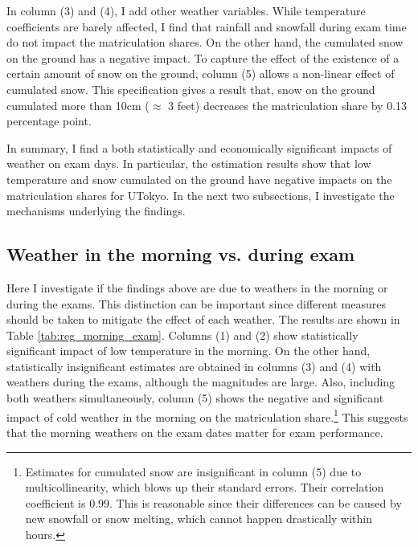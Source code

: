 \documentclass[12pt,letterpaper]{article}
\begin{document}
In column (3) and (4), I add other weather variables.
While temperature coefficients are barely affected, I find that rainfall and snowfall during exam time do not impact the matriculation shares.
On the other hand, the cumulated snow on the ground has a negative impact.
To capture the effect of the existence of a certain amount of snow on the ground, column (5) allows a non-linear effect of cumulated snow.
This specification gives a result that, snow on the ground cumulated more than 10cm ($\approx$ 3 feet) decreases the matriculation share by 0.13 percentage point.

In summary, I find a both statistically and economically significant impacts of weather on exam days.
In particular, the estimation results show that low temperature and snow cumulated on the ground have negative impacts on the matriculation shares for UTokyo.
In the next two subsections, I investigate the mechanisms underlying the findings. 

%  

\subsection{Weather in the morning vs. during exam}

Here I investigate if the findings above are due to weathers in the morning or during the exams.
This distinction can be important since different measures should be taken to mitigate the effect of each weather.
The results are shown in Table \ref{tab:reg_morning_exam}.
Columns (1) and (2) show statistically significant impact of low temperature in the morning.
On the other hand, statistically insignificant estimates are obtained in columns (3) and (4) with weathers during the exams, although the magnitudes are large.
Also, including both weathers simultaneously, column (5) shows the negative and significant impact of cold weather in the morning on the matriculation share.\footnote{
  Estimates for cumulated snow are insignificant in column (5) due to multicollinearity, which blows up their standard errors.
  Their correlation coefficient is 0.99.
  This is reasonable since their differences can be caused by new snowfall or snow melting, which cannot happen drastically within hours.
}
This suggests that the morning weathers on the exam dates matter for exam performance.
\end{document}
